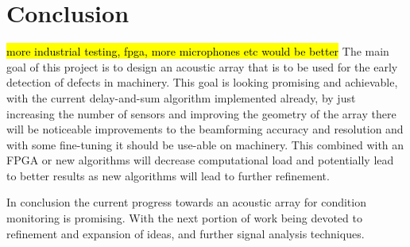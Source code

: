 \documentclass{UoNMCHA}
\numberwithin{equation}{section}
\begin{document}
\section{Conclusion} \label{sec:Conclusion}
    \hl{more industrial testing, fpga, more microphones etc would be better}
    The main goal of this project is to design an acoustic array that is to be used for the early detection of defects in machinery. This goal is looking promising and achievable, with the current delay-and-sum algorithm implemented already, by just increasing the number of sensors and improving the geometry of the array there will be noticeable improvements to the beamforming accuracy and resolution and with some fine-tuning it should be use-able on machinery. This combined with an FPGA or new algorithms will decrease computational load and potentially lead to better results as new algorithms will lead to further refinement.  
    
    In conclusion the current progress towards an acoustic array for condition monitoring is promising. With the next portion of work being devoted to refinement and expansion of ideas, and further signal analysis techniques.
\newpage


\newpage
\appendix
\captionsetup[figure]{list=no}
\end{document}
